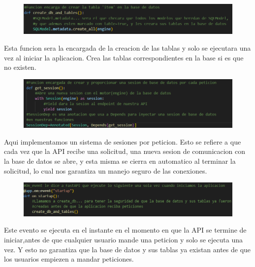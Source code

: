 \documentclass[12pt]{article}
\begin{document}
\begin{figure}[h!]
    \centering
    \includegraphics[width=1\textwidth]{Imagenes/Imagen WEB 3_5.png}
\end{figure}

Esta funcion sera la encargada de la creacion de las tablas y solo se ejecutara una vez al iniciar la aplicacion.
Crea las tablas correspondientes en la base si es que no existen.

\begin{figure}[H]
    \centering
    \includegraphics[width=1\textwidth]{Imagenes/Imagen WEB 3_6.png}
\end{figure}

Aqui implementamos un sistema de sesiones por peticion. Esto se refiere a que cada vez que la API recibe una solicitud, una nueva sesion de comunicacion con la base de datos
se abre, y esta misma se cierra en automatico al terminar la solicitud, lo cual nos garantiza un manejo seguro de las conexiones.

\begin{figure}[H]
    \centering
    \includegraphics[width=1\textwidth]{Imagenes/Imagen WEB 3_7.png}
\end{figure}

Este evento se ejecuta en el instante en el momento en que la API se termine de iniciar,antes de que cualquier usuario mande una peticion y solo se ejecuta una vez.
Y esto no garantiza que la base de datos y sus tablas ya existan antes de que los usuarios empiezen a mandar peticiones.

\newpage %
\end{document}
